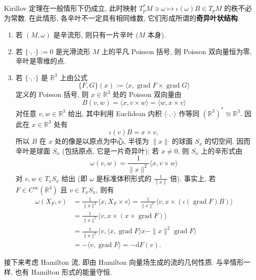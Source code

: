 \begin{RiemannRemark}\label{rem:singular-symplectic-foliation}
Kirillov 定理在一般情形下仍成立, 此时映射 $T_p^*M\ni\omega\mapsto\iota(\omega)B\in T_pM$ 的秩不必为常数. 在此情形, 各辛叶不一定具有相同维数, 它们形成所谓的\textbf{奇异叶状结构}.
\end{RiemannRemark}

\begin{RiemannExample}\label{ex:symplectic-leaves-for-basic-poisson-structures}
\begin{enumerate}[label=(\arabic*),ref=\arabic*,leftmargin=*]
\item 若 $(M,\omega)$ 是辛流形, 则只有一片辛叶 ($M$ 本身).
\item 若 $\{\cdot,\cdot\}:=0$ 是光滑流形 $M$ 上的平凡 Poisson 括号, 则 Poisson 双向量恒为零, 辛叶是零维的点.
\item 若 $\{\cdot,\cdot\}$ 是 $\mathbb{R}^3$ 上由公式
\[
  \{F,G\}(x):=\langle x,\operatorname{grad}F\times\operatorname{grad}G\rangle
\]
定义的 Poisson 括号, 则 $x\in\mathbb{R}^3$ 处的 Poisson 双向量由
\[
  B(v,w)=\langle x,v\times w\rangle=\langle w,x\times v\rangle
\]
对任意 $v,w\in\mathbb{R}^3$ 给出, 其中利用 Euclidean 内积 $\langle\cdot,\cdot\rangle$ 作等同 $(\mathbb{R}^3)^*\cong\mathbb{R}^3$. 因此在 $x\in\mathbb{R}^3$ 处有
\[
  \iota(v)B=x\times v,
\]
所以 $B$ 在 $x$ 处的像是以原点为中心, 半径为 $\|x\|$ 的球面 $S_x$ 的切空间. 因而辛叶是球面 $S_x$ (包括原点, 它是一片奇异叶); 若 $x\ne0$, 则 $S_x$ 上的辛形式由
\[
  \omega(v,w)=\frac{1}{\|x\|^2}\langle x,v\times w\rangle
\]
对 $v,w\in T_xS_x$ 给出 (即 $\omega$ 是标准体积形式的 $\frac{1}{\|x\|}$ 倍). 事实上, 若 $F\in C^\infty(\mathbb{R}^3)$ 且 $v\in T_xS_x$, 则有
\begin{align*}
  \omega(X_F,v)
  &=\frac{1}{\|x\|^2}\langle x,X_F\times v\rangle
   =\frac{1}{\|x\|^2}\langle v,x\times(\iota(\operatorname{grad}F)B)\rangle\\
  &=\frac{1}{\|x\|^2}\langle v,x\times(x\times\operatorname{grad}F)\rangle\\
  &=\frac{1}{\|x\|^2}\bigl\langle v,\langle x,\operatorname{grad}F\rangle x
                              -\|x\|^2\operatorname{grad}F\bigr\rangle\\
  &=-\langle v,\operatorname{grad}F\rangle=-\mathrm{d}F(v).
\end{align*}
\end{enumerate}
\end{RiemannExample}

接下来考虑 Hamilton 流, 即由 Hamilton 向量场生成的流的几何性质. 与辛情形一样, 也有 Hamilton 形式的能量守恒.

